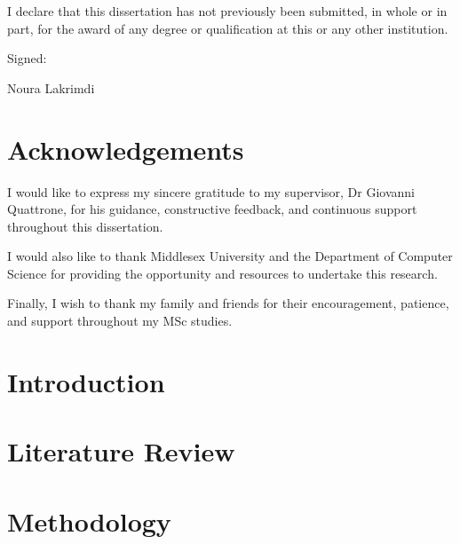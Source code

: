 \documentclass[12pt,a4paper,oneside]{report}
\begin{document}
I declare that this dissertation has not previously been submitted, in whole or in part, for the award of any degree or qualification at this or any other institution.

\vspace{1.5cm}

Signed:

\vspace{1cm}

Noura Lakrimdi

\clearpage

\chapter*{Acknowledgements}

I would like to express my sincere gratitude to my supervisor, Dr Giovanni Quattrone, for his guidance, constructive feedback, and continuous support throughout this dissertation.

I would also like to thank Middlesex University and the Department of Computer Science for providing the opportunity and resources to undertake this research.

Finally, I wish to thank my family and friends for their encouragement, patience, and support throughout my MSc studies.

\clearpage

\tableofcontents
\clearpage

\listoftables
\clearpage

\listoffigures
\clearpage



\chapter{Introduction}

\FloatBarrier

\chapter{Literature Review}

\FloatBarrier

\chapter{Methodology}

\FloatBarrier
\end{document}
